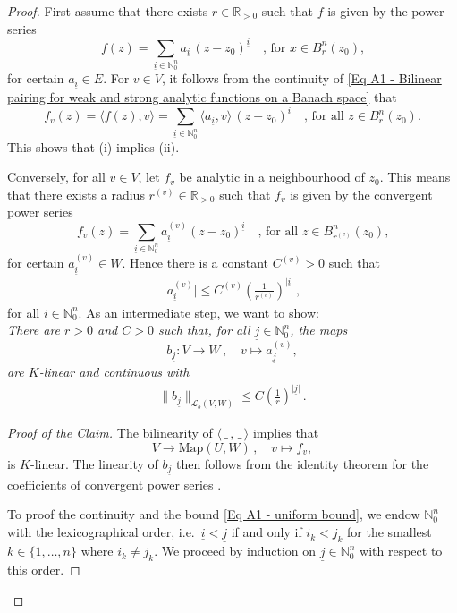 \documentclass[a4paper, reqno, 10pt]{amsart}
\theoremstyle{definition}
\numberwithin{equation}{section}
\newcommand{\abs}[1]{{\lvert{#1}\rvert}}
\newcommand{\blank}{{\,\_\,}}
\newcommand{\lra}{\longrightarrow}
\newcommand{\lto}{\longmapsto}
\newcommand{\norm}[1]{\lVert{#1}\rVert}
\newcommand{\ul}[1]{{\underline{#1}}}
\newcommand{\BN}{{\mathbb {N}}}
\newcommand{\BR}{{\mathbb {R}}}
\newcommand{\CL}{{\mathcal {L}}}
\begin{document}
\begin{proof}
First assume that there exists $r\in \BR_{>0}$ such that $f$ is given by the power series
\begin{equation*}
	f(z) = \sum_{\ul{i}\in \BN^n_0} a_{\ul{i}} \, (z-z_0)^\ul{i} \quad\text{, for $x\in B_r^{n}(z_0)$,}
\end{equation*}
for certain $a_{\ul{i}} \in E$.
For $v\in V$, it follows from the continuity of \eqref{Eq A1 - Bilinear pairing for weak and strong analytic functions on a Banach space} that
\begin{equation*}
	f_v(z) = \langle f(z),v\rangle  = \sum_{\ul{i}\in \BN^n_0} \langle a_{\ul{i}} , v\rangle \,  (z-z_0)^\ul{i} \quad\text{, for all $z \in B_r^{n}(z_0)$.}
\end{equation*}
This shows that (i) implies (ii).

Conversely, for all $v \in V$, let $f_v$ be analytic in a neighbourhood of $z_0$.
This means that there exists a radius $r^{(v)} \in \BR_{>0}$ such that $f_v$ is given by the convergent power series
\[f_v (z) = \sum_{\ul{i} \in \BN^n_0} a_\ul{i}^{(v)} (z-z_0)^\ul{i} \quad \text{, for all $z \in B^{n}_{r^{(v)}}(z_0)$,}\]
for certain $a_\ul{i}^{(v)} \in W$.
Hence there is a constant $C^{(v)} >0$ such that
\begin{align}\label{Eq A1 - pointwise bound}
	\abs{a_\ul{i}^{(v)}} \leq  C^{(v)} \left( \frac{1}{r^{(v)}} \right)^{\abs{\ul{i}}} \, ,
\end{align}
for all $\ul{i} \in \BN^n_0$.
As an intermediate step, we want to show:\\

\textit{There are $r>0$ and $C>0$ such that, for all $\ul{j}\in \BN^n_0$, the maps}
\[ b_\ul{j} \colon  V \lra W \, , \quad  v \lto a_\ul{j}^{(v)} , \]
\textit{are $K$-linear and continuous with}
\begin{align}\label{Eq A1 - uniform bound}
	\norm{ b_\ul{j} }_{\CL_b(V,W)} \leq C \left(\frac{1}{r}\right)^{\abs{\ul{j}}} \, .
\end{align}

\begin{proof}[Proof of the Claim]
	The bilinearity of $\langle \blank,\blank \rangle$ implies that 
	\[ V \lra \mathrm{Map}(U,W) \, , \quad v \lto f_v , \]
	is $K$-linear. 
	The linearity of $b_\ul{j}$ then follows from the identity theorem for the coefficients of convergent power series \cite[3.2.1 resp.\ 4.2.1]{Bourbaki07VarDiffAnFasciDeResult}.
	
	To proof the continuity and the bound \eqref{Eq A1 - uniform bound}, we endow $\BN^n_0$ with the lexicographical order, i.e.\ $\ul{i}<\ul{j}$ if and only if $i_k < j_k$ for the smallest $k \in \{1,\ldots,n\}$ where $i_k \neq j_k$.
	We proceed by induction on $\ul{j} \in \BN^n_0$ with respect to this order.
	

\end{proof}
\end{proof}
\end{document}
